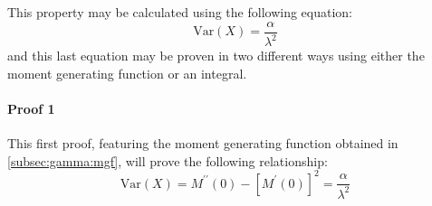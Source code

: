 \documentclass[12pt]{article}
\begin{document}
This property may be calculated using the following equation:
\begin{equation}\label{eq:gamma:var}
	\text{Var}(X) = \frac{\alpha}{\lambda^2}
\end{equation}
and this last equation may be proven in two different ways using either the moment generating function or an integral.

\paragraph{Proof 1}
This first proof, featuring the moment generating function obtained in \autoref{subsec:gamma:mgf}, will prove the
following relationship:
\begin{equation}\label{eq:gamma:var:proof1}
	\text{Var}(X) = M^{\prime\prime}(0) - [M^\prime(0)]^2 = \frac{\alpha}{\lambda^2}
\end{equation}
\end{document}
